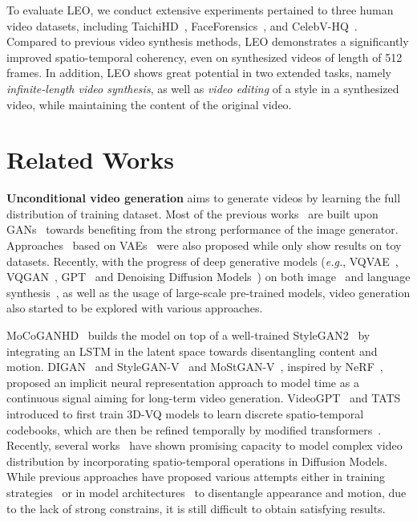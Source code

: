 {To evaluate LEO,
we conduct extensive experiments pertained to three human video datasets,
including TaichiHD~\cite{fomm}, FaceForensics~\cite{rossler2018faceforensics}, and CelebV-HQ~\cite{zhu2022celebvhq}. 
Compared to previous video synthesis methods,
LEO demonstrates a significantly improved spatio-temporal coherency,
even on synthesized videos of length of 512 frames.
In addition,
LEO shows great potential in two extended tasks,
namely \textit{infinite-length video synthesis},
as well as \textit{video editing} of a style in a synthesized video, while maintaining the content of the original video.

\section{Related Works}
\textbf{Unconditional video generation} aims to generate videos by learning the full distribution of training dataset. Most of the previous works~\cite{vondrick2016generating,saito2017temporal,tulyakov2017mocogan,wang2020g3an,wang:tel-03551913,wang2021inmodegan,clark2019adversarial, brooks2022generating} are built upon GANs~\cite{goodfellow2014generative, radford2015unsupervised, brock2018large, karras2019style, stylegan2} towards benefiting from the strong performance of the image generator. Approaches~\cite{NIPS2017_2d2ca7ee,li2018disentangled,bhagat2020disentangling,xie2020motion} based on VAEs~\cite{kingma2013auto} were also proposed while only show results on toy datasets. 
Recently, with the progress of deep generative models (\textit{e.g.}, VQVAE~\cite{vqvae}, VQGAN~\cite{vqgan}, GPT~\cite{gpt} and Denoising Diffusion Models~\cite{ddpm, ddim, nichol2021improved}) on both image~\cite{dalle, dalle2} and language synthesis~\cite{radford2019language}, as well as the usage of large-scale pre-trained models, video generation also started to be explored with various approaches.

MoCoGANHD~\cite{mocoganhd} builds the model on top of a well-trained StyleGAN2~\cite{stylegan2} by integrating an LSTM in the latent space towards disentangling content and motion. DIGAN~\cite{digan} and StyleGAN-V~\cite{stylegan-v} and MoStGAN-V~\cite{mostgan}, inspired by NeRF~\cite{feichtenhofer2019slowfast}, proposed an implicit neural representation approach to model time as a continuous signal aiming for long-term video generation. VideoGPT~\cite{videogpt} and TATS~\cite{tats} introduced to first train 3D-VQ models to learn discrete spatio-temporal codebooks, which are then be refined temporally by modified transformers~\cite{transformer}. Recently, several works{~\cite{vdm,pvdm,videofusion}} have shown promising capacity to model complex video distribution by incorporating spatio-temporal operations in Diffusion Models. While previous approaches have proposed various attempts either in training strategies~\cite{mocoganhd,videogpt,tats} or in model architectures~\cite{wang2020g3an,wang2021inmodegan,digan,stylegan-v} to disentangle appearance and motion, due to the lack of strong constrains, it is still difficult to obtain satisfying results. 

}
